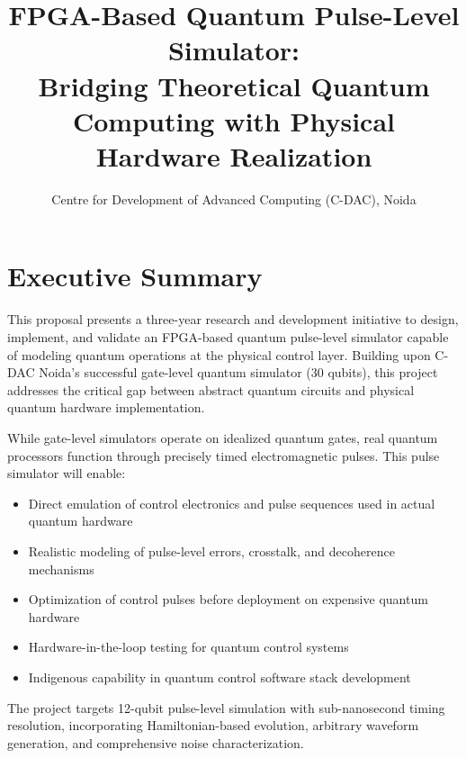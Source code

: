 \documentclass[12pt,a4paper]{article}
\title{\textbf{FPGA-Based Quantum Pulse-Level Simulator:\\Bridging Theoretical Quantum Computing with Physical Hardware Realization}}
\author{Centre for Development of Advanced Computing (C-DAC), Noida}
\date{}
\begin{document}
\maketitle

\section*{Executive Summary}

This proposal presents a three-year research and development initiative to design, implement, and validate an FPGA-based quantum pulse-level simulator capable of modeling quantum operations at the physical control layer. Building upon C-DAC Noida's successful gate-level quantum simulator (30 qubits), this project addresses the critical gap between abstract quantum circuits and physical quantum hardware implementation.

While gate-level simulators operate on idealized quantum gates, real quantum processors function through precisely timed electromagnetic pulses. This pulse simulator will enable:

\begin{itemize}[noitemsep]
    \item Direct emulation of control electronics and pulse sequences used in actual quantum hardware
    \item Realistic modeling of pulse-level errors, crosstalk, and decoherence mechanisms
    \item Optimization of control pulses before deployment on expensive quantum hardware
    \item Hardware-in-the-loop testing for quantum control systems
    \item Indigenous capability in quantum control software stack development
\end{itemize}

The project targets 12-qubit pulse-level simulation with sub-nanosecond timing resolution, incorporating Hamiltonian-based evolution, arbitrary waveform generation, and comprehensive noise characterization.
\end{document}
